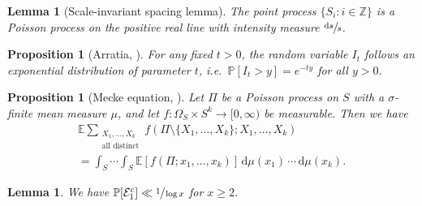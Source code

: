 \documentclass[10pt,a4paper]{article}
\providecommand{\ie}{i.e.\ }
\newcommand{\ZZ}{\mathbb{Z}}
\newcommand{\PP}{\mathbb{P}}
\newcommand{\EE}{\mathbb{E}}
\newcommand{\EC}{\mathcal{E}}
\newcommand{\prob}[1]{\PP[ #1 ]}
\theoremstyle{plain}
\newtheorem{lem}[cor]{Lemma}
\newtheorem{prop}[cor]{Proposition}
\theoremstyle{definition}
\begin{document}
\begin{lem}[Scale-invariant spacing lemma]
\label{lem:scale-invariant-spacing-lemma}
The point process $\{S_i : i \in \ZZ\}$ is a Poisson process on the positive real line with intensity measure $\sfrac{\mathrm ds}{s}$.
\end{lem}

\begin{prop}[Arratia, \cite{Arratia02}]
\label{prop:icexponential}
For any fixed $t > 0$, the random variable $I_t$ follows an exponential distribution of parameter $t$, \ie $\prob{I_t > y} = e^{-ty}$ for all $y > 0$.
\end{prop}

\begin{prop}[Mecke equation, {\cite[Th.\,4.5]{LastPenrose18}}]
\label{prel:mecke}
Let $\Pi$ be a Poisson process on $S$ with a $\sigma$-finite mean measure $\mu$, and let $f: \Omega_S \times S^k \to [0, \infty)$ be measurable. Then we have
\begin{multline*}
\EE \sum_{\substack{X_1, \ldots, X_k \\ \text{all distinct}}} f(\Pi\setminus \{X_1, \ldots, X_k\}; X_1, \ldots, X_k) \\[-10pt]
= \int_S \cdots \int_S \EE[f(\Pi; x_1, \ldots, x_k)] \, \mathrm d\mu(x_1)\, \cdots\, \mathrm d\mu(x_k).
\end{multline*}
\end{prop}

\begin{lem}
\label{lem:prob e1c}
We have $\PP[\EC_1^c] \ll \sfrac{1}{\log x}$ for $x\ge2$.
\end{lem}
\end{document}
